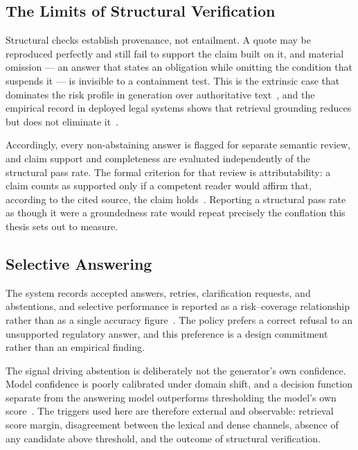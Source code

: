 \subsection{The Limits of Structural Verification}

Structural checks establish provenance, not entailment. A quote may be reproduced perfectly and still fail to support the claim built on it, and material omission --- an answer that states an obligation while omitting the condition that suspends it --- is invisible to a containment test. This is the extrinsic case that dominates the risk profile in generation over authoritative text~\cite{ji2023hallucination}, and the empirical record in deployed legal systems shows that retrieval grounding reduces but does not eliminate it~\cite{magesh2025hallucination}.

Accordingly, every non-abstaining answer is flagged for separate semantic review, and claim support and completeness are evaluated independently of the structural pass rate. The formal criterion for that review is attributability: a claim counts as supported only if a competent reader would affirm that, according to the cited source, the claim holds~\cite{rashkin2023attribution}. Reporting a structural pass rate as though it were a groundedness rate would repeat precisely the conflation this thesis sets out to measure.

\subsection{Selective Answering}

The system records accepted answers, retries, clarification requests, and abstentions, and selective performance is reported as a risk--coverage relationship rather than as a single accuracy figure~\cite{geifman2017selective}. The policy prefers a correct refusal to an unsupported regulatory answer, and this preference is a design commitment rather than an empirical finding.

The signal driving abstention is deliberately not the generator's own confidence. Model confidence is poorly calibrated under domain shift, and a decision function separate from the answering model outperforms thresholding the model's own score~\cite{kamath2020selective}. The triggers used here are therefore external and observable: retrieval score margin, disagreement between the lexical and dense channels, absence of any candidate above threshold, and the outcome of structural verification.

